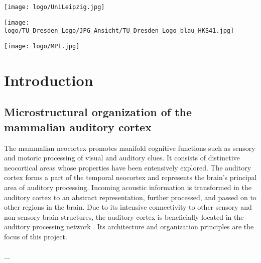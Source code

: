 \documentclass[12pt,oneside,ngerman,reqno,a4paper]{article}
\numberwithin{equation}{section}
\begin{document}
\begin{titlepage}
	 \begin{minipage}{0.3\textwidth}
		\texttt{[image: logo/UniLeipzig.jpg]}
	\end{minipage}
	\hfill
	\begin{minipage}{0.3\textwidth}
		\texttt{[image: logo/TU\_Dresden\_Logo/JPG\_Ansicht/TU\_Dresden\_Logo\_blau\_HKS41.jpg]}
	\end{minipage}
	\hfill
\begin{minipage}{0.15\textwidth}
	\texttt{[image: logo/MPI.jpg]}
\end{minipage}
	
\end{titlepage}





\newpage
\tableofcontents
{}
\newpage
{}

\begin{abstract}

\end{abstract}
\newpage

\section{Introduction}
\subsection{Microstructural organization of the mammalian auditory cortex}
The mammalian neocortex promotes manifold cognitive functions such as sensory and motoric processing of visual and auditory clues. It consists of distinctive neocortical areas whose properties have been entensively explored. The auditory cortex forms a part of the temporal neocortex and represents the brain’s principal area of auditory processing. Incoming acoustic information is transformed in the auditory cortex to an abstract representation, further processed, and passed on to other regions in the brain. Due to its intensive connectivity to other sensory and non-sensory brain structures, the auditory cortex is beneficially located in the auditory processing network \cite{Budinger2018}. Its architecture and organization principles are the focus of this project. \\
\\
...\\
\end{document}
